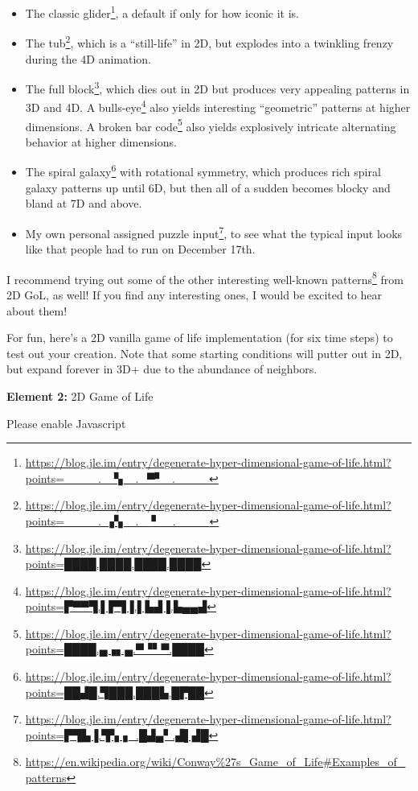 \documentclass[]{article}
\renewcommand{\href}[2]{#2\footnote{\url{#1}}}
\begin{document}
\begin{itemize}
\tightlist
\item
  The
  \href{https://blog.jle.im/entry/degenerate-hyper-dimensional-game-of-life.html?points=____._▝▖_._▀▘_.____}{classic
  glider}, a default if only for how iconic it is.
\item
  The
  \href{https://blog.jle.im/entry/degenerate-hyper-dimensional-game-of-life.html?points=____._▞▖_._▝__.____}{tub},
  which is a ``still-life'' in 2D, but explodes into a twinkling frenzy during
  the 4D animation.
\item
  The
  \href{https://blog.jle.im/entry/degenerate-hyper-dimensional-game-of-life.html?points=████.████.████.████}{full
  block}, which dies out in 2D but produces very appealing patterns in 3D and
  4D. A
  \href{https://blog.jle.im/entry/degenerate-hyper-dimensional-game-of-life.html?points=▛▀▀▜.▌▛▜▐.▌▙▟▐.▙▄▄▟}{bulls-eye}
  also yields interesting ``geometric'' patterns at higher dimensions. A
  \href{https://blog.jle.im/entry/degenerate-hyper-dimensional-game-of-life.html?points=████.▄▗▖▄.▀▝▘▀.████}{broken
  bar code} also yields explosively intricate alternating behavior at higher
  dimensions.
\item
  The
  \href{https://blog.jle.im/entry/degenerate-hyper-dimensional-game-of-life.html?points=██▟█.▜███.███▙.█▛██}{spiral
  galaxy} with rotational symmetry, which produces rich spiral galaxy patterns
  up until 6D, but then all of a sudden becomes blocky and bland at 7D and
  above.
\item
  My
  \href{https://blog.jle.im/entry/degenerate-hyper-dimensional-game-of-life.html?points=▛▜▙▐.▜▚▗_.█▟▄▘.▟▌▟█}{own
  personal assigned puzzle input}, to see what the typical input looks like that
  people had to run on December 17th.
\end{itemize}

I recommend trying out some of the
\href{https://en.wikipedia.org/wiki/Conway\%27s_Game_of_Life\#Examples_of_patterns}{other
interesting well-known patterns} from 2D GoL, as well! If you find any
interesting ones, I would be excited to hear about them!

For fun, here's a 2D vanilla game of life implementation (for six time steps) to
test out your creation. Note that some starting conditions will putter out in
2D, but expand forever in 3D+ due to the abundance of neighbors.

\leavevmode\hypertarget{gol2D}{}%
\textbf{Element 2:} 2D Game of Life

\leavevmode\hypertarget{gol2DCont}{}%
Please enable Javascript
\end{document}
